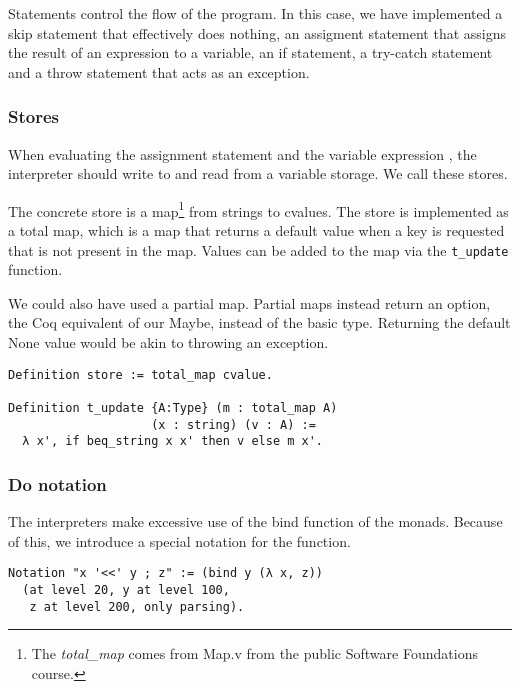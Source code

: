 Statements control the flow of the program. In this case, we have implemented a
skip statement that effectively does nothing, an assigment statement that
assigns the result of an expression to a variable, an if statement, a try-catch
statement and a throw statement that acts as an exception.

\subsubsection{Stores}\label{sec:stores}
When evaluating the assignment statement  and the variable
expression , the interpreter should write to and read from a variable
storage. We call these stores. 

The concrete store is a map\footnote{The \textit{total\_map} comes from 
	Map.v from the public Software Foundations course.\cite{softwarefoundations}} 
from strings to cvalues. The store is implemented as a total map, which is a
map that returns a default value when a key is requested that is not present in
the map. Values can be added to the map via the \texttt{t_update }
function.

We could also have used a partial map. Partial maps instead return an option,
the Coq equivalent of our Maybe, instead of the basic type.
Returning the default None value would be akin to throwing an exception.

\begin{listing}
\begin{verbatim}
Definition store := total_map cvalue.

Definition t_update {A:Type} (m : total_map A)
                    (x : string) (v : A) :=
  λ x', if beq_string x x' then v else m x'.

\end{verbatim}
\end{listing}

\subsubsection{Do notation}
The interpreters make excessive use of the bind function of the monads.
Because of this, we introduce a special notation for the function.

\begin{listing}
\begin{verbatim}
Notation "x '<<' y ; z" := (bind y (λ x, z))
  (at level 20, y at level 100, 
   z at level 200, only parsing).
\end{verbatim}
\end{listing}

